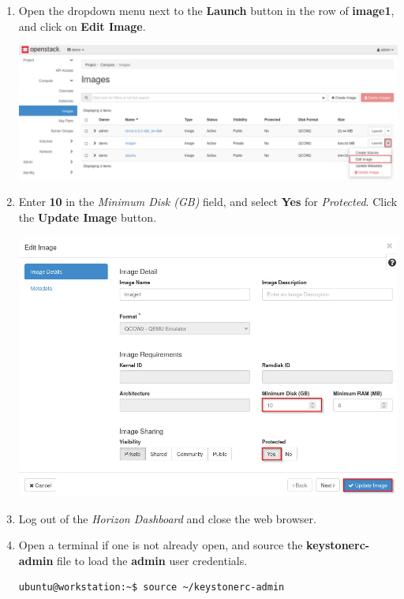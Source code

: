 \documentclass[letterpaper, 12pt]{article}
\begin{document}
\begin{enumerate}
    \item Open the dropdown menu next to the \textbf{Launch} button in the row of \textbf{image1}, and click on
    \textbf{Edit Image}.

    \begin{center}
        \includegraphics[width=\linewidth]{images/part1/step6.png}
    \end{center}

    \item Enter \textbf{10} in the \textit{Minimum Disk (GB)} field, and select \textbf{Yes} for \textit{Protected}.
    Click the \textbf{Update Image} button.

    \begin{center}
        \includegraphics[width=\linewidth]{images/part1/step7.png}
    \end{center}

    \item Log out of the \textit{Horizon Dashboard} and close the web browser.

    \item Open a terminal if one is not already open, and source the \textbf{keystonerc-admin} file to load the
    \textbf{admin} user credentials.
\begin{lstlisting}
ubuntu@workstation:~$ source ~/keystonerc-admin
\end{lstlisting}


\end{enumerate}
\end{document}
